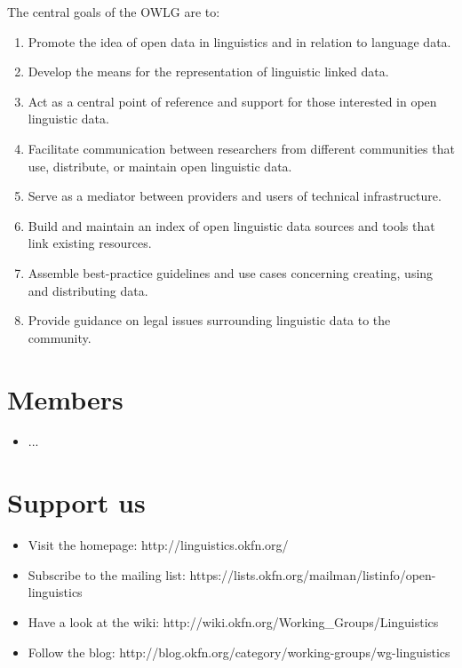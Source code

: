 \documentclass[
notumble,
nofoldmark,
]{leaflet}
\begin{document}
The central goals of the OWLG are to:
\begin{enumerate}

\item Promote the idea of open data in linguistics and in relation to language data.
\item Develop the means for the representation of linguistic linked data.
\item Act as a central point of reference and support for those interested in open linguistic data.
\item Facilitate communication between researchers from different communities that use, distribute, or maintain open linguistic data.
\item Serve as a mediator between providers and users of technical infrastructure.
\item Build and maintain an index of open linguistic data sources and tools that link existing resources.
\item Assemble best-practice guidelines and use cases concerning creating, using and distributing data.
\item Provide guidance on legal issues surrounding linguistic data to the community.

\end{enumerate}
 
\newpage  %
\section{Members}

\begin{itemize}
 \item ...
\end{itemize}

     
\newpage   %
\section{Support us}

\begin{itemize}
 \item Visit the homepage: http://linguistics.okfn.org/
 \item Subscribe to the mailing list: https://lists.okfn.org/mailman/listinfo/open-linguistics
 \item Have a look at the wiki: http://wiki.okfn.org/Working_Groups/Linguistics
 \item Follow the blog: http://blog.okfn.org/category/working-groups/wg-linguistics
\end{itemize}

\loggingall
\end{document}
